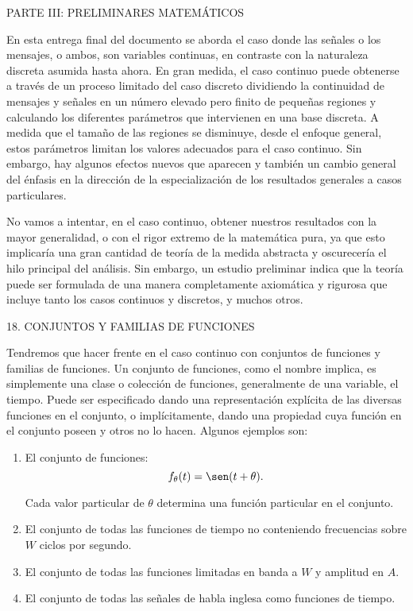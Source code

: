 
PARTE III: PRELIMINARES MATEM\'ATICOS
\newline

En esta entrega final del documento se aborda el caso donde las se\~nales o
los mensajes, o ambos, son variables continuas, en contraste con la naturaleza
discreta asumida hasta ahora. En gran medida, el caso continuo puede obtenerse
a trav\'es de un proceso limitado del caso discreto dividiendo la continuidad
de mensajes y se\~nales en un n\'umero elevado pero finito de peque\~nas
regiones y calculando los diferentes par\'ametros que intervienen en una base
discreta. A medida que el tama\~no de las regiones se disminuye, desde el
enfoque general, estos par\'ametros limitan los valores adecuados para el caso
continuo. Sin embargo, hay algunos efectos nuevos que aparecen y tambi\'en un
cambio general del \'enfasis en la direcci\'on de la especializaci\'on de los
resultados generales a casos particulares.

No vamos a intentar, en el caso continuo, obtener nuestros resultados con la
mayor generalidad, o con el rigor extremo de la matem\'atica pura, ya que esto
implicar\'ia una gran cantidad de teor\'ia de la medida abstracta y
oscurecer\'ia el hilo principal del an\'alisis. Sin embargo, un estudio
preliminar indica que la teor\'ia puede ser formulada de una manera
completamente axiom\'atica y rigurosa que incluye tanto los casos continuos y
discretos, y muchos otros.
\newline

18. CONJUNTOS Y FAMILIAS DE FUNCIONES
\newline

Tendremos que hacer frente en el caso continuo con conjuntos de funciones y
familias de funciones. Un conjunto de funciones, como el nombre implica, es
simplemente una clase o colecci\'on de funciones, generalmente de una variable,
el tiempo. Puede ser especificado dando una representaci\'on expl\'icita de las
diversas funciones en el conjunto, o impl\'icitamente, dando una propiedad cuya
funci\'on en el conjunto poseen y otros no lo hacen. Algunos ejemplos son:

\begin{enumerate}
  \item El conjunto de funciones:
  \begin{equation}
    f_{\theta}(t) = \sen(t+\theta).
  \end{equation}

  Cada valor particular de $\theta$ determina una funci\'on particular en el
  conjunto.

  \item El conjunto de todas las funciones de tiempo no conteniendo frecuencias
  sobre $W$ ciclos por segundo.

  \item El conjunto de todas las funciones limitadas en banda a $W$ y amplitud
  en $A$.

  \item El conjunto de todas las se\~nales de habla inglesa como funciones de
  tiempo.
\end{enumerate}

